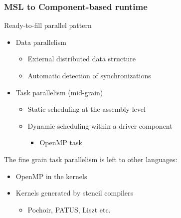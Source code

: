 \documentclass{beamer}
\begin{document}
\begin{frame}
\frametitle{MSL to Component-based runtime}
\begin{block}{Ready-to-fill parallel pattern}
\begin{itemize}
\item Data parallelism
\begin{itemize}
\item External distributed data structure
\item Automatic detection of synchronizations
\end{itemize}
\item Task parallelism (mid-grain)
\begin{itemize}
\item Static scheduling at the assembly level 
\item Dynamic scheduling within a driver component
  \begin{itemize}
  \item OpenMP task
  \end{itemize}
\end{itemize}
\end{itemize}
\end{block}
The fine grain task parallelism is left to other languages: 
\begin{itemize}
\item OpenMP in the kernels
\item Kernels generated by stencil compilers
  \begin{itemize}
  \item Pochoir, PATUS, Liszt etc.
  \end{itemize}
\end{itemize}
\end{frame}
\end{document}
